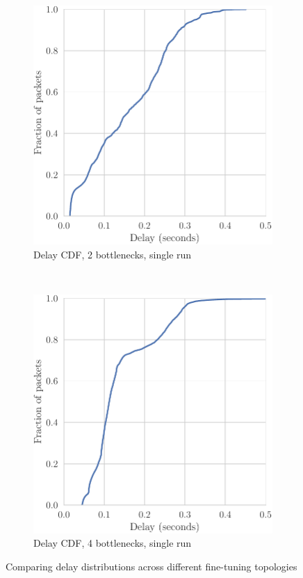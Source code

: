 \begin{figure}[h]
    \centering
    \begin{subfigure}[h]{0.5\textwidth}
        \centering
        \includegraphics[scale=0.57]{figures/delay2.pdf}
        \caption{Delay CDF, 2 bottlenecks, single run}
    \end{subfigure}%
    ~ 
    \begin{subfigure}[h]{0.5\textwidth}
        \centering
        \includegraphics[scale=0.57]{figures/delay4.pdf}
        \caption{Delay CDF, 4 bottlenecks, single run}
    \end{subfigure}
    \caption{Comparing delay distributions across different fine-tuning topologies}
    \label{fig:multibottle}
\end{figure}


